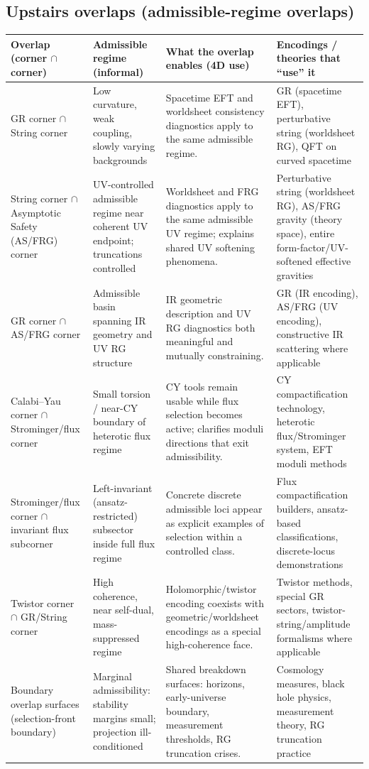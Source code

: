 \documentclass[11pt]{article}
\begin{document}
\subsection*{Upstairs overlaps (admissible-regime overlaps)}
\begin{center}
\small
\begin{tabular}{|p{3.8cm}|p{4.2cm}|p{5.2cm}|p{3.4cm}|}
\hline
\textbf{Overlap (corner $\cap$ corner)} &
\textbf{Admissible regime (informal)} &
\textbf{What the overlap enables (4D use)} &
\textbf{Encodings / theories that ``use'' it} \\
\hline
GR corner $\cap$ String corner &
Low curvature, weak coupling, slowly varying backgrounds &
Spacetime EFT and worldsheet consistency diagnostics apply to the same admissible regime. &
GR (spacetime EFT), perturbative string (worldsheet RG), QFT on curved spacetime \\
\hline
String corner $\cap$ Asymptotic Safety (AS/FRG) corner &
UV-controlled admissible regime near coherent UV endpoint; truncations controlled &
Worldsheet and FRG diagnostics apply to the same admissible UV regime; explains shared UV softening phenomena. &
Perturbative string (worldsheet RG), AS/FRG gravity (theory space), entire form-factor/UV-softened effective gravities \\
\hline
GR corner $\cap$ AS/FRG corner &
Admissible basin spanning IR geometry and UV RG structure &
IR geometric description and UV RG diagnostics both meaningful and mutually constraining. &
GR (IR encoding), AS/FRG (UV encoding), constructive IR scattering where applicable \\
\hline
Calabi--Yau corner $\cap$ Strominger/flux corner &
Small torsion / near-CY boundary of heterotic flux regime &
CY tools remain usable while flux selection becomes active; clarifies moduli directions that exit admissibility. &
CY compactification technology, heterotic flux/Strominger system, EFT moduli methods \\
\hline
Strominger/flux corner $\cap$ invariant flux subcorner &
Left-invariant (ansatz-restricted) subsector inside full flux regime &
Concrete discrete admissible loci appear as explicit examples of selection within a controlled class. &
Flux compactification builders, ansatz-based classifications, discrete-locus demonstrations \\
\hline
Twistor corner $\cap$ GR/String corner &
High coherence, near self-dual, mass-suppressed regime &
Holomorphic/twistor encoding coexists with geometric/worldsheet encodings as a special high-coherence face. &
Twistor methods, special GR sectors, twistor-string/amplitude formalisms where applicable \\
\hline
Boundary overlap surfaces (selection-front boundary) &
Marginal admissibility: stability margins small; projection ill-conditioned &
Shared breakdown surfaces: horizons, early-universe boundary, measurement thresholds, RG truncation crises. &
Cosmology measures, black hole physics, measurement theory, RG truncation practice \\
\hline
\end{tabular}
\end{center}
\end{document}

